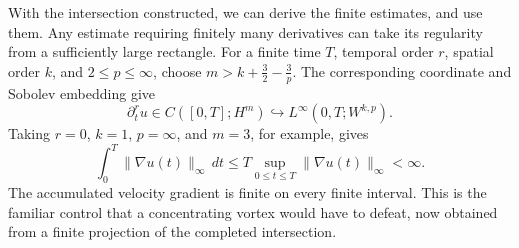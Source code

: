 With the intersection constructed, we can derive the finite estimates,
and use them. Any estimate requiring finitely many derivatives can take its
regularity from a sufficiently large rectangle. For a finite time \(T\),
temporal order \(r\), spatial order \(k\), and \(2\le p\le\infty\), choose
\(m>k+\tfrac32-\tfrac3p\). The corresponding coordinate and Sobolev embedding
give
\[
 \partial_t^ru\in C([0,T];H^m)
 \hookrightarrow L^\infty(0,T;W^{k,p}).
\]
Taking \(r=0\), \(k=1\), \(p=\infty\), and \(m=3\), for example, gives
\[
 \int_0^T\|\nabla u(t)\|_\infty\,dt
 \le T\sup_{0\le t\le T}\|\nabla u(t)\|_\infty<\infty.
\]
The accumulated velocity gradient is finite on every finite interval.
This is the familiar control that a concentrating vortex would have to
defeat, now obtained from a finite projection of the completed intersection.

\endgroup
